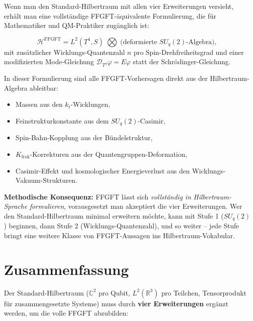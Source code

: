 Wenn man den Standard-Hilbertraum mit allen vier Erweiterungen
versieht, erhält man eine vollständige FFGFT-äquivalente
Formulierung, die für Mathematiker und QM-Praktiker zugänglich ist:

\begin{equation}
  \mathcal{H}^{\text{FFGFT}}
  = L^2(T^4, S) \;\bigotimes\; \text{(deformierte $SU_q(2)$-Algebra)},
\end{equation}
mit zusätzlicher Wicklungs-Quantenzahl $n$ pro
Spin-Drehfreiheitsgrad und einer modifizierten Mode-Gleichung
$\mathcal{D}_{T^4}\varphi = E \varphi$ statt der
Schrödinger-Gleichung.

In dieser Formulierung sind alle FFGFT-Vorhersagen direkt aus der
Hilbertraum-Algebra ableitbar:
\begin{itemize}[leftmargin=2em,itemsep=2pt,topsep=2pt]
  \item Massen aus den $k_t$-Wicklungen,
  \item Feinstrukturkonstante aus dem $SU_q(2)$-Casimir,
  \item Spin-Bahn-Kopplung aus der Bündelstruktur,
  \item $K_{\text{frak}}$-Korrekturen aus der Quantengruppen-Deformation,
  \item Casimir-Effekt und kosmologischer Energieverlust aus den
        Wicklungs-Vakuum-Strukturen.
\end{itemize}

\textbf{Methodische Konsequenz:} FFGFT lässt sich \emph{vollständig
in Hilbertraum-Sprache formulieren}, vorausgesetzt man akzeptiert die
vier Erweiterungen. Wer den Standard-Hilbertraum minimal erweitern
möchte, kann mit Stufe 1 ($SU_q(2)$) beginnen, dann Stufe 2
(Wicklungs-Quantenzahl), und so weiter -- jede Stufe bringt eine
weitere Klasse von FFGFT-Aussagen ins Hilbertraum-Vokabular.

\section{Zusammenfassung}

Der Standard-Hilbertraum ($\mathbb{C}^2$ pro Qubit, $L^2(\mathbb{R}^3)$
pro Teilchen, Tensorprodukt für zusammengesetzte Systeme) muss durch
\textbf{vier Erweiterungen} ergänzt werden, um die volle FFGFT
abzubilden:

